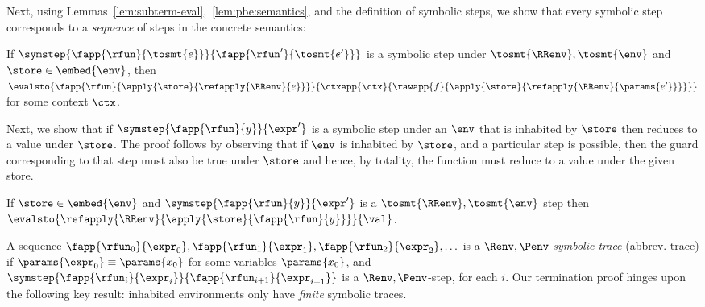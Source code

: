 %
Next, using Lemmas~\ref{lem:subterm-eval},~\ref{lem:pbe:semantics},
and the definition of symbolic steps, we show that every
symbolic step corresponds to a \emph{sequence} of steps
in the concrete semantics:

\begin{lemma}\label{lem:step-reductions}
If   $\symstep{\fapp{\rfun}{\tosmt{e}}}{\fapp{\rfun'}{\tosmt{e'}}}$
     is a symbolic step under $\tosmt{\RRenv}, \tosmt{\env}$
		 and
		 $\store\in \embed{\env}$,
then $\evalsto{{\fapp{\rfun}{\apply{\store}{\refapply{\RRenv}{e}}}}}
              {\ctxapp{\ctx}{\rawapp{f}{\apply{\store}{\refapply{\RRenv}{\params{e'}}}}}}$
for some context $\ctx$.
\end{lemma}

%
Next, we show that if
$\symstep{\fapp{\rfun}{y}}{\expr'}$
is a symbolic step under an $\env$
that is inhabited by $\store$
then  reduces
to a value under $\store$.
%
The proof follows by observing
that if $\env$ is inhabited by
$\store$, and a particular step
is possible, then the guard
corresponding to that step
must also be true under
$\store$ and hence, by totality,
the function must reduce to
a value under the given store.


\newcommand{\rjtrans}[3]{\ensuremath{\evalsto{{{\refapply{#1}{#2}}}}{#3}}}
\newcommand{\rjtranstore}[4]{\rjtrans{#1}{\apply{#2}{#3}}{#4}}

\begin{lemma}\label{lem:step-value}
If   $\store \in \embed{\env}$
     and
     $\symstep{\fapp{\rfun}{y}}{\expr'}$
	   is a $\tosmt{\RRenv}, \tosmt{\env}$ step
then \rjtranstore{\RRenv}{\store}{\fapp{\rfun}{y}}{\val}.
\end{lemma}

%
A sequence
%
$\fapp{\rfun_0}{\expr_0},\fapp{\rfun_1}{\expr_1},\fapp{\rfun_2}{\expr_2},\ldots$
%
is a $\Renv,\Penv$-\emph{symbolic trace} (abbrev. trace)
if $\params{\expr_0} \equiv \params{x_0}$ for some variables $\params{x_0}$,
and $\symstep{\fapp{\rfun_i}{\expr_i}}{\fapp{\rfun_{i+1}}{\expr_{i+1}}}$
is a $\Renv,\Penv$-step, for each $i$.
%
Our termination proof hinges upon the following key result: inhabited
environments only have \emph{finite} symbolic traces.


